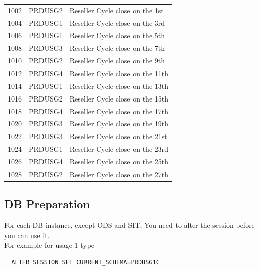 \documentclass[12pt,twoside]{article}
\begin{document}
\begin{center}
\begin{tabular}{rll}
               1002  &  PRDUSG2            &  Reseller Cycle close on the 1st                  \\
               1004  &  PRDUSG1            &  Reseller Cycle close on the 3rd                  \\
               1006  &  PRDUSG1            &  Reseller Cycle close on the 5th                  \\
               1008  &  PRDUSG3            &  Reseller Cycle close on the 7th                  \\
               1010  &  PRDUSG2            &  Reseller Cycle close on the 9th                  \\
               1012  &  PRDUSG4            &  Reseller Cycle close on the 11th                 \\
               1014  &  PRDUSG1            &  Reseller Cycle close on the 13th                 \\
               1016  &  PRDUSG2            &  Reseller Cycle close on the 15th                 \\
               1018  &  PRDUSG4            &  Reseller Cycle close on the 17th                 \\
               1020  &  PRDUSG3            &  Reseller Cycle close on the 19th                 \\
               1022  &  PRDUSG3            &  Reseller Cycle close on the 21st                 \\
               1024  &  PRDUSG1            &  Reseller Cycle close on the 23rd                 \\
               1026  &  PRDUSG4            &  Reseller Cycle close on the 25th                 \\
               1028  &  PRDUSG2            &  Reseller Cycle close on the 27th                 \\
\hline
\end{tabular}
\end{center}



\normalsize
\subsection{DB Preparation}
\label{sec-8-2}

   For each DB instance, except ODS and SIT, You need to alter the session before you can use it.\\ For example  for usage 1 type
\begin{verbatim}
  ALTER SESSION SET CURRENT_SCHEMA=PRDUSG1C
\end{verbatim}
\end{document}
